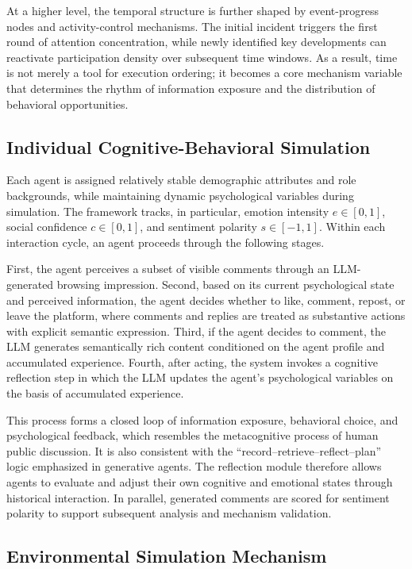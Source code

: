 At a higher level, the temporal structure is further shaped by event-progress nodes and activity-control mechanisms. The initial incident triggers the first round of attention concentration, while newly identified key developments can reactivate participation density over subsequent time windows. As a result, time is not merely a tool for execution ordering; it becomes a core mechanism variable that determines the rhythm of information exposure and the distribution of behavioral opportunities.

\subsection{Individual Cognitive-Behavioral Simulation}

Each agent is assigned relatively stable demographic attributes and role backgrounds, while maintaining dynamic psychological variables during simulation. The framework tracks, in particular, emotion intensity \(e \in [0,1]\), social confidence \(c \in [0,1]\), and sentiment polarity \(s \in [-1,1]\). Within each interaction cycle, an agent proceeds through the following stages.

First, the agent perceives a subset of visible comments through an LLM-generated browsing impression. Second, based on its current psychological state and perceived information, the agent decides whether to like, comment, repost, or leave the platform, where comments and replies are treated as substantive actions with explicit semantic expression. Third, if the agent decides to comment, the LLM generates semantically rich content conditioned on the agent profile and accumulated experience. Fourth, after acting, the system invokes a cognitive reflection step in which the LLM updates the agent's psychological variables on the basis of accumulated experience.

This process forms a closed loop of information exposure, behavioral choice, and psychological feedback, which resembles the metacognitive process of human public discussion. It is also consistent with the ``record--retrieve--reflect--plan'' logic emphasized in generative agents. The reflection module therefore allows agents to evaluate and adjust their own cognitive and emotional states through historical interaction. In parallel, generated comments are scored for sentiment polarity to support subsequent analysis and mechanism validation.

\subsection{Environmental Simulation Mechanism}

